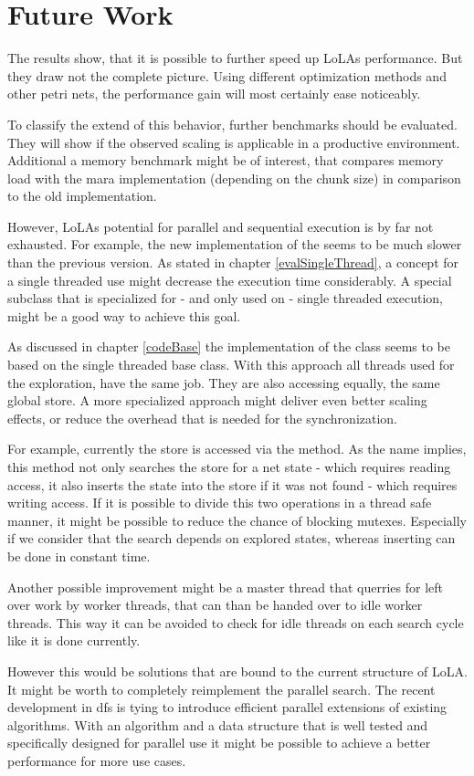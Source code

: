 \chapter{Future Work}
The results show, that it is possible to further speed up LoLAs performance. But they draw not the complete picture. Using different optimization methods and other petri nets, the performance gain will most certainly ease noticeably.

To classify the extend of this behavior, further benchmarks should be evaluated. They will show if the observed scaling is applicable in a productive environment. Additional a memory benchmark might be of interest, that compares memory load with the mara implementation (depending on the chunk size) in comparison to the old implementation.

However, LoLAs potential for parallel and sequential execution is by far not exhausted. For example, the new implementation of the  seems to be much slower than the previous version. As stated in chapter \ref{evalSingleThread}, a concept for a single threaded use might decrease the execution time considerably. A special subclass that is specialized for - and only used on - single threaded execution, might be a good way to achieve this goal.

As discussed in chapter \ref{codeBase} the implementation of the  class seems to be based on the single threaded base class. With this approach all threads used for the exploration, have the same job. They are also accessing equally, the same global store. A more specialized approach might deliver even better scaling effects, or reduce the overhead that is needed for the synchronization.

For example, currently the store is accessed via the  method. As the name implies, this method not only searches the store for a net state - which requires reading access, it also inserts the state into the store if it was not found - which requires writing access. If it is possible to divide this two operations in a thread safe manner, it might be possible to reduce the chance of blocking mutexes. Especially if we consider that the search depends on explored states, whereas inserting can be done in constant time.

Another possible improvement might be a master thread that querries for left over work by worker threads, that can than be handed over to idle worker threads. This way it can be avoided to check for idle threads on each search cycle like it is done currently.

However this would be solutions that are bound to the current structure of LoLA. It might be worth to completely reimplement the parallel search. The recent development in dfs is tying to introduce efficient parallel extensions of existing algorithms\cite{bloemen2016multi}\cite{holzmann2008stack}. With an algorithm and a data structure that is well tested and specifically designed for parallel use it might be possible to achieve a better performance for more use cases.